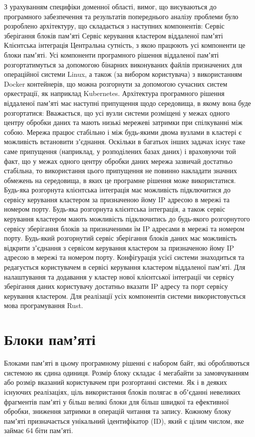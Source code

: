 \documentclass[14pt]{article}
\begin{document}
З урахуванням специфіки доменної області, вимог, що висуваються до програмного забезпечення та результатів попереднього аналізу проблеми було розроблено архітектуру, що складається з наступних компонентів:
Сервіс зберігання блоків памʼяті
Сервіс керування кластером віддаленої памʼяті
Клієнтська інтеграція
	Центральна сутність, з якою працюють усі компоненти це блоки памʼяті.
	Усі компоненти програмного рішення віддаленої памʼяті розгортатимуться за допомогою бінарних виконуваних файлів призначених для операційної системи Linux, а також (за вибором користувача) з використанням Docker контейнерів, що можна розгорнути за допомогою сучасних систем оркестрації, як наприклад Kubernetes.
	Архітектура програмного рішення віддаленої памʼяті має наступні припущення щодо середовища, в якому вона буде розгортатися:
Вважається, що усі вузли системи розміщені у межах одного центру обробки даних та мають низькі мережеві затримки при спілкуванні між собою.
Мережа працює стабільно і між будь-якими двома вузлами в кластері є можливість встановити зʼєднання. Оскільки в багатьох інших задачах існує таке саме припущення (наприклад, у розподілених базах даних) і враховуючи той факт, що у межах одного центру обробки даних мережа зазвичай достатньо стабільна, то використання цього припущення не повинно накладати значних обмежень на середовища, в яких це програмне рішення може використатися.
Будь-яка розгорнута клієнтська інтеграція має можливість підключитися до сервісу керування кластером за призначеною йому IP адресою в мережі та номером порту.
Будь-яка розгорнута клієнтська інтеграція, а також сервіс керування кластером мають можливість підключитись до будь-якого розгорнутого сервісу зберігання блоків за призначеними їм IP адресами в мережі та номером порту.
Будь-який розгорнутий сервіс зберігання блоків даних має можливість відкрити зʼєднання з сервісом керування кластером за призначеною йому IP адресою в мережі та номером порту.
	Конфігурація усієї системи знаходиться та редагується користувачем в сервісі керування кластером віддаленої памʼяті. Для налаштування та додавання у кластер нової клієнтської інтеграції чи сервісу зберігання даних користувачу достатньо вказати IP адресу та порт сервісу керування кластером.
	Для реалізації усіх компонентів системи використовується мова програмування Rust.

\section {Блоки памʼяті}

Блоками памʼяті в цьому програмному рішенні є набором байт, які обробляються системою як єдина одиниця. Розмір блоку складає 4 мегабайти за замовчуванням або розмір вказаний користувачем при розгортанні системи. Як і в деяких існуючих реалізаціях, ціль використання блоків полягає в обʼєданні невеликих фрагментів памʼяті у більш великі блоки для більш швидкої та ефективної обробки, зниження затримки в операцій читання та запису.
	Кожному блоку памʼяті призначається унікальний ідентифікатор (ID), який є цілим числом, яке займає 64 біти памʼяті.
\end{document}
